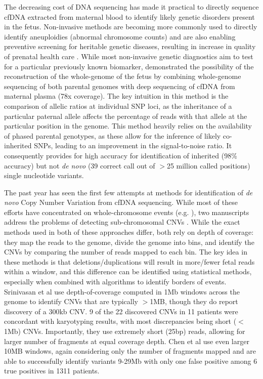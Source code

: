 The decreasing cost of DNA sequencing has made it practical to directly sequence cfDNA extracted from maternal blood to identify likely genetic disorders present in the fetus.  Non-invasive methods are becoming more commonly used to directly identify aneuploidies (abnormal chromosome counts) and are also enabling preventive screening for heritable genetic diseases, resulting in increase in quality of prenatal health care \cite{saunders2012}.  While most non-invasive genetic diagnostics aim to test for a particular previously known biomarker,  \cite{kitzman2012} demonstrated the possibility of the reconstruction of the whole-genome of the fetus by combining whole-genome sequencing of both parental genomes with deep sequencing of cfDNA from maternal plasma (78x coverage). The key intuition in this method is the comparison of allelic ratios at individual SNP loci, as the inheritance of a particular paternal allele affects the percentage of reads with that allele at the particular position in the genome.  This method heavily relies on the availability of phased parental genotypes, as these allow for the inference of likely co-inherited SNPs, leading to an improvement in the signal-to-noise ratio. It consequently provides for high accuracy for identification of inherited (98\% accuracy) but not \emph{de novo}  (39 correct call out of $>$25 million called positions) single nucleotide variants.

The past year has seen the first few attempts at methods for identification of \emph{de novo}  Copy Number Variation from cfDNA sequencing. While most of these efforts have concentrated on whole-chromosome events (e.g. \cite{chu2009}), two manuscripts address the problems of detecting sub-chromosomal CNVs \cite{chen2013, srinivasan2013}. While the exact methods used in both of these approaches differ, both rely on depth of coverage:  they map the reads to the genome, divide the genome into bins, and identify the CNVs by comparing the number of reads mapped to each bin. The key idea in these methods is that deletions/duplications will result in more/fewer fetal reads within a window, and this difference can be identified using statistical methods, especially when combined with algorithms to identify borders of events. Srinivasan et al use depth-of-coverage computed in 1Mb windows across the genome to identify CNVs that are typically $>$1MB, though they do report discovery of a 300kb CNV. 9 of the 22 discovered CNVs in 11 patients were concordant with karyotyping results, with most discrepancies being short ($<$1Mb) CNVs. Importantly, they use extremely short (25bp) reads, allowing for larger number of fragments at equal coverage depth. Chen et al use even larger 10MB windows, again considering only the number of fragments mapped  and are able to successfully identify variants 9-29Mb with only one false positive among 6 true positives in 1311 patients.


